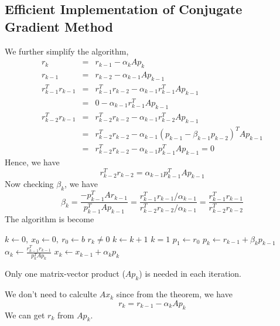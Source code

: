 
\subsection{Efficient Implementation of Conjugate Gradient Method}

We further simplify the algorithm, 
\begin{eqnarray*}
r_k & = & r_{k-1} - \alpha_k Ap_k \\
r_{k-1}& = & r_{k-2} - \alpha_{k-1}Ap_{k-1} \\
r_{k-1}^T r_{k-1} & = & r_{k-1}^T r_{k-2}
- \alpha_{k-1} r_{k-1}^T A p_{k-1} \\
& = & 0 - \alpha_{k-1} r_{k-1}^T Ap_{k-1}\\
r_{k-2}^T r_{k-1} & = & r_{k-2}^T r_{k-2}
- \alpha_{k-1} r_{k-2}^T A p_{k-1}\\
& = & r_{k-2}^T r_{k-2}
- \alpha_{k-1}
(p_{k-1} - \beta_{k-1} p_{k-2})^T A p_{k-1}\\
& = & r_{k-2}^T r_{k-2}
- \alpha_{k-1}
p_{k-1}^T A p_{k-1} = 0
\end{eqnarray*}
Hence, we have \[
r_{k-2}^T r_{k-2} = \alpha_{k-1} p_{k-1}^T A p_{k-1} 
\]
Now checking $\beta_k$, we have \begin{equation*}
\beta_k =
\frac{-p_{k-1}^T A r_{k-1}}{p_{k-1}^T A p_{k-1}}
=
\frac{r_{k-1}^T  r_{k-1}/\alpha_{k-1}}{r_{k-2}^T  r_{k-2}/\alpha_{k-1}}
=
\frac{r_{k-1}^T  r_{k-1}}{r_{k-2}^T  r_{k-2}}
\end{equation*}
The algorithm is become
\begin{codebox}
\li $k \gets 0,\ x_0 \gets 0,\ r_0 \gets b$
\li \While $r_k \neq 0$ \Do
\li     $k \gets k + 1$
\li     \If $k = 1$ \Then
\li         $p_1 \gets r_0$
\li     \Else
\li         {}
\li         $p_k \gets r_{k-1} + \beta_k p_{k-1}$
\End
\li     $\alpha_k \gets \frac{r_{k-1}^T r_{k-1}}{p_k^T A p_k}$
\li     $x_k \gets x_{k-1} + \alpha_k p_k$
\li     {}
\End
\end{codebox}

Only one matrix-vector product ($A p_k$) is needed in each iteration.

\begin{note}
    We don't need to calculte $A x_k$ since from the theorem, we have \[
        r_k = r_{k-1} - \alpha_k A p_k
    \]
    We can get $r_k$ from $A p_k$.
\end{note}

